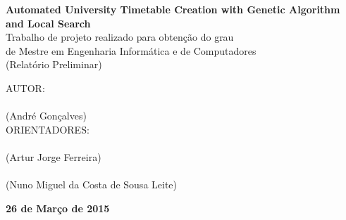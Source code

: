 \begin{titlepage}
\begin{center}
		\fontsize{18pt}{10pt}\selectfont
		{\textbf{Automated University Timetable Creation with Genetic Algorithm and Local Search}} \\[0.8cm]
		\fontsize{16pt}{10pt}\selectfont
		{Trabalho de projeto realizado para obten\c cão do grau\\de Mestre em Engenharia Informática e de Computadores} \\[0.8cm]
		(Relatório Preliminar)\\ [0.5cm]
		\vfill
		\begin{center}
		   \fontsize{12pt}{10pt}\selectfont
		   AUTOR:\\[0.8cm]
		   \underline{\hspace{12cm}}\\[0.2cm]
		   \fontsize{11pt}{10pt}\selectfont
		   (André Gonçalves)\\[1.5cm]
		   \fontsize{12pt}{10pt}\selectfont
		   ORIENTADORES: \\[0.8cm]
		   \underline{\hspace{12cm}}\\[0.2cm]
		   \fontsize{11pt}{10pt}\selectfont
		   (Artur Jorge Ferreira) \\[0.8cm]
		   \fontsize{11pt}{10pt}\selectfont
		   \underline{\hspace{12cm}}\\[0.2cm]
		   \hspace{1.1cm}(Nuno Miguel da Costa de Sousa Leite) \\ [1.5cm]
		\end{center}
		\fontsize{10pt}{10pt}\selectfont
		\textbf{26 de Março de 2015}
	\end{center}
\end{titlepage}
